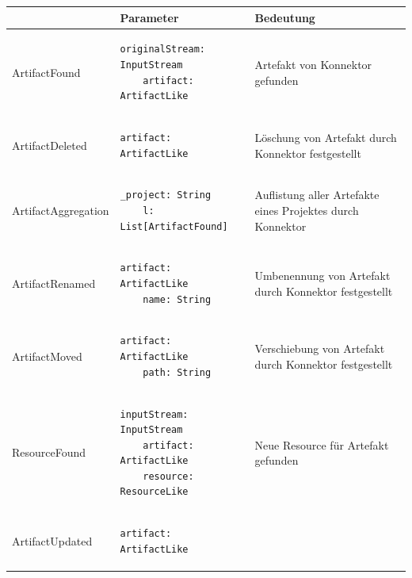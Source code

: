 \begin{table}
    \begin{tabular}{|l|l|p{4.8cm}|}
    \hline
    ~                   & Parameter                                                                & Bedeutung                                                  \\ \hline
    ArtifactFound       & \begin{lstlisting}[gobble=4] 
    originalStream: InputStream
    artifact: ArtifactLike
    \end{lstlisting}                      & \gls{Artefakt} von \gls{Konnektor} gefunden                            \\ \hline
    ArtifactDeleted     & \begin{lstlisting}[gobble=4]
    artifact: ArtifactLike
    \end{lstlisting}                                                   & Löschung von \gls{Artefakt} durch \gls{Konnektor} festgestellt         \\ \hline
    ArtifactAggregation & \begin{lstlisting}[gobble=4]
    _project: String
    l: List[ArtifactFound]
    \end{lstlisting}                                 & Auflistung aller \gls{Artefakt}e eines Projektes durch \gls{Konnektor} \\ \hline
    ArtifactRenamed     & \begin{lstlisting}[gobble=4]
    artifact: ArtifactLike
    name: String
    \end{lstlisting}                                     & Umbenennung von \gls{Artefakt} durch \gls{Konnektor} festgestellt      \\ \hline
    ArtifactMoved       & \begin{lstlisting}[gobble=4]
    artifact: ArtifactLike
    path: String
    \end{lstlisting}                                     & Verschiebung von \gls{Artefakt} durch \gls{Konnektor} festgestellt     \\ \hline
    ResourceFound       & \begin{lstlisting}[gobble=4]
    inputStream: InputStream
    artifact: ArtifactLike
    resource: ResourceLike
    \end{lstlisting} & Neue Resource für \gls{Artefakt} gefunden                        \\ \hline
    ArtifactUpdated     & \begin{lstlisting}[gobble=4]
    artifact: ArtifactLike

\end{lstlisting}
\end{tabular}
\end{table}

